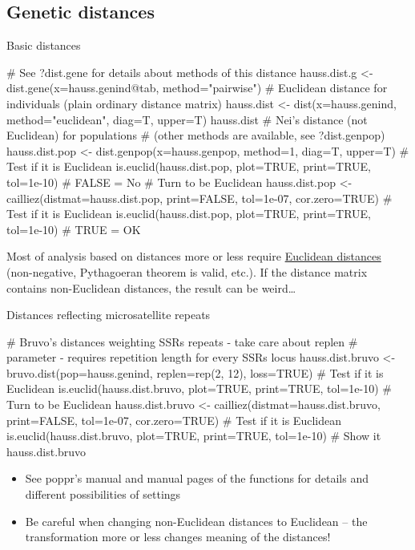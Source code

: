 \documentclass[compress, ucs, xelatex, 11pt, xcolor=svgnames,
  hyperref={
    bookmarks=true,
    unicode=true,
    colorlinks=true,
    pdftitle={Molecular data in R},
    plainpages=false,
    pdfauthor={Vojtech Zeisek},
    pdfsubject={Course about phylogeny and evolution in R},
    pdfcreator={XeLaTeX},
    pdfkeywords={R, evolution, phylogeny, molecular data},
    linkcolor=Tomato,
    anchorcolor=SaddleBrown,
    citecolor=Goldenrod,
    filecolor=DarkMagenta,
    menucolor=Sienna,
    urlcolor=DarkTurquoise,
    pdftex},
  url={hyphens, lowtilde} %
  ]{beamer}
\begin{document}
\subsection{Genetic distances}

\begin{frame}[fragile]{Basic distances}
  \label{distances}
  \begin{spluscode}
    # See ?dist.gene for details about methods of this distance
    hauss.dist.g <- dist.gene(x=hauss.genind@tab, method="pairwise")
    # Euclidean distance for individuals (plain ordinary distance matrix)
    hauss.dist <- dist(x=hauss.genind, method="euclidean", diag=T, upper=T)
    hauss.dist
    # Nei's distance (not Euclidean) for populations
    # (other methods are available, see ?dist.genpop)
    hauss.dist.pop <- dist.genpop(x=hauss.genpop, method=1, diag=T, upper=T)
    # Test if it is Euclidean
    is.euclid(hauss.dist.pop, plot=TRUE, print=TRUE, tol=1e-10) # FALSE = No
    # Turn to be Euclidean
    hauss.dist.pop <- cailliez(distmat=hauss.dist.pop, print=FALSE,
      tol=1e-07, cor.zero=TRUE)
    # Test if it is Euclidean
    is.euclid(hauss.dist.pop, plot=TRUE, print=TRUE, tol=1e-10) # TRUE = OK
  \end{spluscode}
  \vfil
  Most of analysis based on distances more or less require \href{https://en.wikipedia.org/wiki/Euclidean_distance_matrix}{Euclidean distances} (non-negative, Pythagoeran theorem is valid, etc.). If the distance matrix contains non-Euclidean distances, the result can be weird\ldots
  \vfill
\end{frame}

\begin{frame}[fragile]{Distances reflecting microsatellite repeats}
  \begin{spluscode}
    # Bruvo's distances weighting SSRs repeats - take care about replen
    # parameter - requires repetition length for every SSRs locus
    hauss.dist.bruvo <- bruvo.dist(pop=hauss.genind, replen=rep(2, 12),
      loss=TRUE)
    # Test if it is Euclidean
    is.euclid(hauss.dist.bruvo, plot=TRUE, print=TRUE, tol=1e-10)
    # Turn to be Euclidean
    hauss.dist.bruvo <- cailliez(distmat=hauss.dist.bruvo, print=FALSE,
      tol=1e-07, cor.zero=TRUE)
    # Test if it is Euclidean
    is.euclid(hauss.dist.bruvo, plot=TRUE, print=TRUE, tol=1e-10)
    # Show it
    hauss.dist.bruvo
  \end{spluscode}
  \begin{itemize}
    \item See poppr's manual and manual pages of the functions for details and different possibilities of settings
    \item Be careful when changing non-Euclidean distances to Euclidean -- \alert{the transformation more or less changes meaning of the distances!}
  \end{itemize}
\end{frame}
\end{document}
